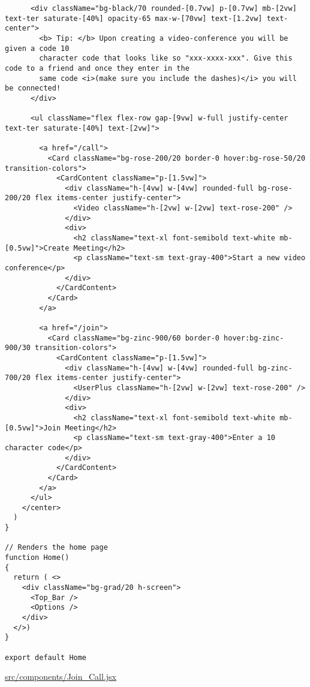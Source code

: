 \begin{verbatim}
      <div className="bg-black/70 rounded-[0.7vw] p-[0.7vw] mb-[2vw] text-ter saturate-[40%] opacity-65 max-w-[70vw] text-[1.2vw] text-center">
        <b> Tip: </b> Upon creating a video-conference you will be given a code 10
        character code that looks like so "xxx-xxxx-xxx". Give this code to a friend and once they enter in the
        same code <i>(make sure you include the dashes)</i> you will be connected!
      </div>

      <ul className="flex flex-row gap-[9vw] w-full justify-center text-ter saturate-[40%] text-[2vw]">

        <a href="/call">
          <Card className="bg-rose-200/20 border-0 hover:bg-rose-50/20 transition-colors">
            <CardContent className="p-[1.5vw]">
              <div className="h-[4vw] w-[4vw] rounded-full bg-rose-200/20 flex items-center justify-center">
                <Video className="h-[2vw] w-[2vw] text-rose-200" />
              </div>
              <div>
                <h2 className="text-xl font-semibold text-white mb-[0.5vw]">Create Meeting</h2>
                <p className="text-sm text-gray-400">Start a new video conference</p>
              </div>
            </CardContent>
          </Card>
        </a>

        <a href="/join">
          <Card className="bg-zinc-900/60 border-0 hover:bg-zinc-900/30 transition-colors">
            <CardContent className="p-[1.5vw]">
              <div className="h-[4vw] w-[4vw] rounded-full bg-zinc-700/20 flex items-center justify-center">
                <UserPlus className="h-[2vw] w-[2vw] text-rose-200" />
              </div>
              <div>
                <h2 className="text-xl font-semibold text-white mb-[0.5vw]">Join Meeting</h2>
                <p className="text-sm text-gray-400">Enter a 10 character code</p>
              </div>
            </CardContent>
          </Card>
        </a>
      </ul>
    </center>
  )
}

// Renders the home page
function Home()
{
  return ( <>
    <div className="bg-grad/20 h-screen">
      <Top_Bar />
      <Options />
    </div>
  </>)
}

export default Home
\end{verbatim}

\underline{src/components/Join\_Call.jsx}

